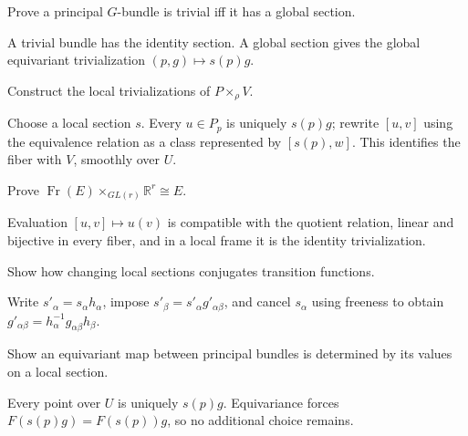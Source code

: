 \begin{problem}\label{prob:vii08-06}
Prove a principal \(G\)-bundle is trivial iff it has a global section.
\end{problem}
\begin{solution}
A trivial bundle has the identity section. A global section gives the global equivariant trivialization \((p,g)\mapsto s(p)g\).
\end{solution}

\begin{problem}\label{prob:vii08-07}
Construct the local trivializations of \(P\times_\rho V\).
\end{problem}
\begin{solution}
Choose a local section \(s\). Every \(u\in P_p\) is uniquely \(s(p)g\); rewrite \([u,v]\) using the equivalence relation as a class represented by \([s(p),w]\). This identifies the fiber with \(V\), smoothly over \(U\).
\end{solution}

\begin{problem}\label{prob:vii08-08}
Prove \(\operatorname{Fr}(E)\times_{GL(r)}\mathbb R^r\cong E\).
\end{problem}
\begin{solution}
Evaluation \([u,v]\mapsto u(v)\) is compatible with the quotient relation, linear and bijective in every fiber, and in a local frame it is the identity trivialization.
\end{solution}

\begin{problem}\label{prob:vii08-09}
Show how changing local sections conjugates transition functions.
\end{problem}
\begin{solution}
Write \(s'_\alpha=s_\alpha h_\alpha\), impose \(s'_\beta=s'_\alpha g'_{\alpha\beta}\), and cancel \(s_\alpha\) using freeness to obtain \(g'_{\alpha\beta}=h_\alpha^{-1}g_{\alpha\beta}h_\beta\).
\end{solution}

\begin{problem}\label{prob:vii08-10}
Show an equivariant map between principal bundles is determined by its values on a local section.
\end{problem}
\begin{solution}
Every point over \(U\) is uniquely \(s(p)g\). Equivariance forces \(F(s(p)g)=F(s(p))g\), so no additional choice remains.
\end{solution}

